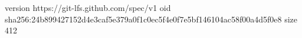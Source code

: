 version https://git-lfs.github.com/spec/v1
oid sha256:24b899427152d4e3caf5e379a0f1c0ec5f4e0f7e5bf146104ac58f00a4d5f0e8
size 412
